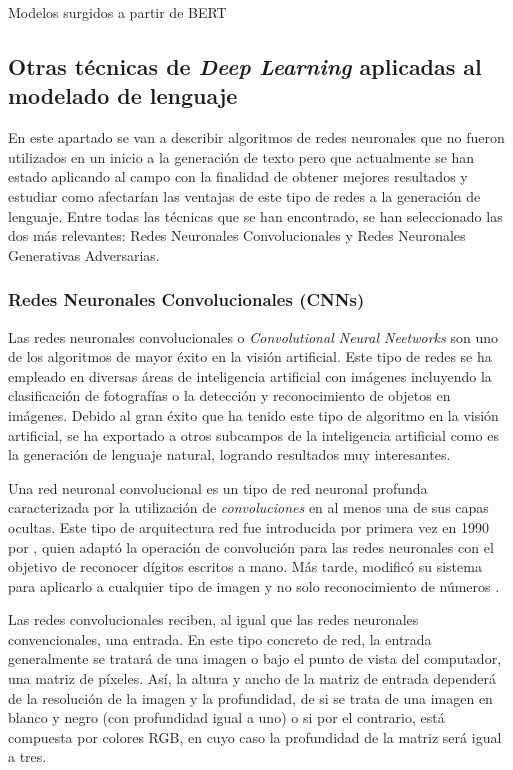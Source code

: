 %
{Modelos surgidos a partir de BERT}





\subsection{Otras técnicas de \textit{Deep Learning} aplicadas al modelado de lenguaje}

En este apartado se van a describir algoritmos de redes neuronales que no fueron utilizados en un inicio a la generación de texto pero que actualmente se han estado aplicando al campo con la finalidad de obtener mejores resultados y estudiar como afectarían las ventajas de este tipo de redes a la generación de lenguaje. Entre todas las técnicas que se han encontrado, se han seleccionado las dos más relevantes: Redes Neuronales Convolucionales y Redes Neuronales Generativas Adversarias.

\subsubsection{Redes Neuronales Convolucionales (CNNs)}
\label{sec:cnn}
Las redes neuronales convolucionales o \textit{Convolutional Neural Neetworks} son uno de los algoritmos de mayor éxito en la visión artificial. Este tipo de redes se ha empleado en diversas áreas de inteligencia artificial con imágenes incluyendo la clasificación de fotografías o la detección y reconocimiento de objetos en imágenes. Debido al gran éxito que ha tenido este tipo de algoritmo en la visión artificial, se ha exportado a otros subcampos de la inteligencia artificial como es la generación de lenguaje natural, logrando resultados muy interesantes. 


Una red neuronal convolucional es un tipo de red neuronal profunda caracterizada por la utilización de \textit{convoluciones} en al menos una de sus capas ocultas. Este tipo de arquitectura red fue introducida por primera vez en 1990 por \citep{LeCun1989HandwrittenDR}, quien adaptó la operación de convolución para las redes neuronales con el objetivo de reconocer dígitos escritos a mano. Más tarde, modificó su sistema para aplicarlo a cualquier tipo de imagen y no solo reconocimiento de números \citep{cnn_lecun}.

Las redes convolucionales reciben, al igual que las redes neuronales convencionales, una entrada. En este tipo concreto de red, la entrada generalmente se tratará de una imagen o bajo el punto de vista del computador, una matriz de píxeles. Así, la altura y ancho de la matriz de entrada dependerá de la resolución de la imagen y la profundidad, de si se trata de una imagen en blanco y negro (con profundidad igual a uno) o si por el contrario, está compuesta por colores RGB, en cuyo caso la profundidad de la matriz será igual a tres.

